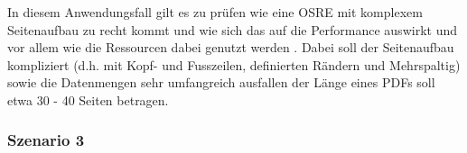 \documentclass[main.tex]{subfiles}
\begin{document}

In diesem Anwendungsfall gilt es zu prüfen wie eine OSRE mit komplexem Seitenaufbau zu recht kommt und wie sich das auf die Performance auswirkt und vor allem wie die Ressourcen dabei genutzt werden . Dabei soll der Seitenaufbau kompliziert (d.h. mit Kopf- und Fusszeilen, definierten Rändern und Mehrspaltig) sowie die Datenmengen sehr umfangreich ausfallen  der Länge eines PDFs soll etwa 30 - 40 Seiten betragen. 

\subsubsection{Szenario 3}
\end{document}
